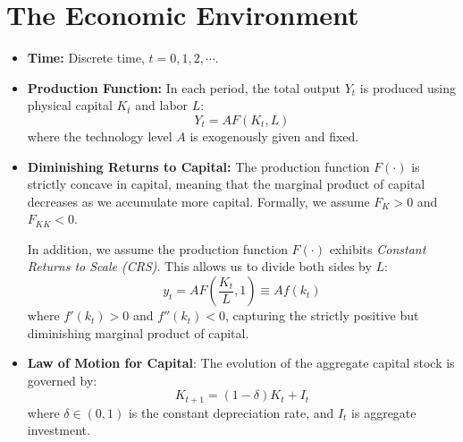 \section{The Economic Environment}

\begin{itemize}
    \item \textbf{Time:} Discrete time, $t = 0,1,2,\cdots$.
    \item \textbf{Production Function:} In each period, the total output $Y_t$ is produced using physical capital $K_t$ and labor $L$:
    $$
    Y_t = A F(K_t,L)
    $$
    where the technology level $A$ is exogenously given and fixed. 
    \item \textbf{Diminishing Returns to Capital:} The production function $F(\cdot)$ is strictly concave in capital, meaning that the marginal product of capital decreases as we accumulate more capital. Formally, we assume $F_K > 0$ and $F_{KK} < 0$.
    
    In addition, we assume the production function $F(\cdot)$ exhibits \textit{Constant Returns to Scale (CRS)}. This allows us to divide both sides by $L$:
$$
y_t = A F\left(\frac{K_t}{L}, 1\right) \equiv A f(k_t)
$$
where $f'(k_t) > 0$ and $f''(k_t) < 0$, capturing the strictly positive but diminishing marginal product of capital. 
    \item \textbf{Law of Motion for Capital}: The evolution of the aggregate capital stock is governed by:
$$
K_{t+1} = (1-\delta)K_t + I_t
$$
where $\delta \in (0,1)$ is the constant depreciation rate, and $I_t$ is aggregate investment. 


\end{itemize}
